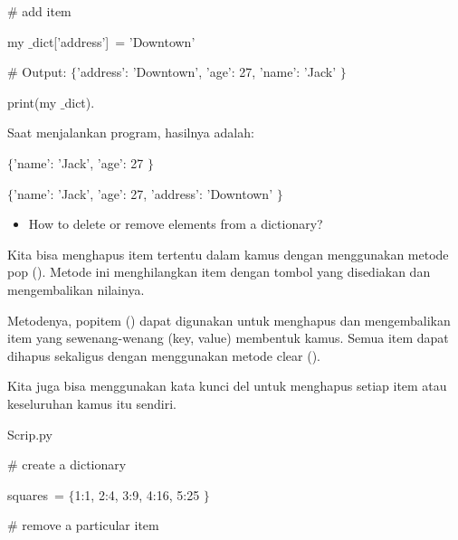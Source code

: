 \noindent 
 \hspace*{0.5in}  $  \#  $ add item \par
\noindent 
 \hspace*{0.5in} my $  \_  $dict['address']~= 'Downtown'   \par
\vspace{12pt}
\noindent 
 \hspace*{0.5in}  $  \#  $ Output:  $  \{  $'address': 'Downtown', 'age': 27, 'name': 'Jack' $  \}  $ \par
\noindent 
 \hspace*{0.5in} print(my $  \_  $dict). \par
\vspace{12pt}
\noindent 
Saat menjalankan program, hasilnya adalah: \par
\noindent 
 $  \{  $'name': 'Jack', 'age': 27 $  \}  $ \par
\noindent 
 $  \{  $'name': 'Jack', 'age': 27, 'address': 'Downtown' $  \}  $ \par
\vspace{12pt}
\noindent 
\begin{itemize}
	\item How to delete or remove elements from a dictionary? \par
\end{itemize}
\noindent 
Kita bisa menghapus item tertentu dalam kamus dengan menggunakan metode pop (). Metode ini menghilangkan item dengan tombol yang disediakan dan mengembalikan nilainya. \par
\noindent 
Metodenya, popitem () dapat digunakan untuk menghapus dan mengembalikan item yang sewenang-wenang (key, value) membentuk kamus. Semua item dapat dihapus sekaligus dengan menggunakan metode clear (). \par
\noindent 
Kita juga bisa menggunakan kata kunci del untuk menghapus setiap item atau keseluruhan kamus itu sendiri. \par
\vspace{12pt}
\noindent 
Scrip.py \par
\vspace{12pt}
\noindent 
 \hspace*{0.5in}  $  \#  $ create a dictionary \par
\noindent 
 \hspace*{0.5in} squares~=  $  \{  $1:1, 2:4, 3:9, 4:16, 5:25 $  \}  $   \par
\vspace{12pt}
\noindent 
 \hspace*{0.5in}  $  \#  $ remove a particular item \par
